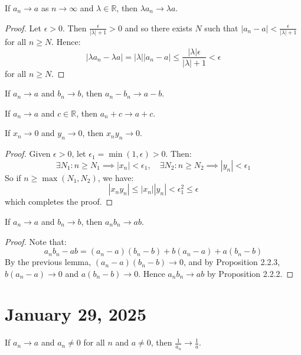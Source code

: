 \documentclass[11pt]{article}
\begin{document}
\begin{proposition}
    If $a_n \to a$ as $n \to \infty$ and $\lambda \in \mathbb{R}$, then $\lambda a_n \to \lambda a$.
\end{proposition}

\begin{proof}
    Let $\epsilon > 0$. Then $\frac{\epsilon}{|\lambda| + 1} > 0$ and so there exists $N$ such that $|a_n - a| < \frac{\epsilon}{|\lambda| + 1}$ for all $n \geq N$. Hence:
    \[
        |\lambda a_n - \lambda a| = |\lambda| |a_n - a| \leq \frac{|\lambda| \epsilon}{|\lambda| + 1} < \epsilon
    \]
    for all $n \geq N$.
\end{proof}

\begin{corollary}
    If $a_n \to a$ and $b_n \to b$, then $a_n - b_n \to a - b$.
\end{corollary}

\begin{corollary}
    If $a_n \to a$ and $c \in \mathbb{R}$, then $a_n + c \to a + c$.
\end{corollary}

\begin{lemma}
    If $x_n \to 0$ and $y_n \to 0$, then $x_n y_n \to 0$.
\end{lemma}

\begin{proof}
    Given $\epsilon > 0$, let $\epsilon_1 = \min(1, \epsilon) > 0$. Then:
    \[
        \exists N_1 : n \geq N_1 \implies |x_n| < \epsilon_1, \quad \exists N_2 : n \geq N_2 \implies |y_n| < \epsilon_1
    \]
    So if $n \geq \max(N_1, N_2)$, we have:
    \[
        |x_n y_n| \leq |x_n| |y_n| < \epsilon_1^2 \leq \epsilon
    \]
    which completes the proof.
\end{proof}

\begin{proposition}
    If $a_n \to a$ and $b_n \to b$, then $a_n b_n \to ab$.
\end{proposition}

\begin{proof}
    Note that:
    \[
        a_n b_n - ab = (a_n - a)(b_n - b) + b(a_n - a) + a(b_n - b)
    \]
    By the previous lemma, $(a_n - a)(b_n - b) \to 0$, and by Proposition 2.2.3,
    $b(a_n - a) \to 0$ and $a(b_n - b) \to 0$. Hence $a_n b_n \to ab$ by
    Proposition 2.2.2.
\end{proof}
\section{January 29, 2025}
\begin{proposition}
    If $a_n \to a$ and $a_n \neq 0$ for all $n$ and $a \neq 0$, then $\frac{1}{a_n} \to \frac{1}{a}$.
\end{proposition}
\end{document}
